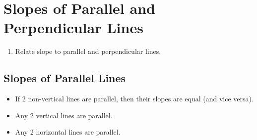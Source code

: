 \documentclass{article}
\begin{document}
\section*{Slopes of Parallel and Perpendicular Lines}

\begin{tcolorbox}[colframe=orange!70!white, coltitle=black, title=\textbf{Today I Can}]
\begin{enumerate}
    \item Relate slope to parallel and perpendicular lines.
\end{enumerate}
\end{tcolorbox}

\subsection*{Slopes of Parallel Lines}


\begin{itemize}
    \item If 2 non-vertical lines are parallel, then their slopes are equal (and vice versa).
    \item Any 2 vertical lines are parallel.
    \item Any 2 horizontal lines are parallel.
\end{itemize}
\end{document}
